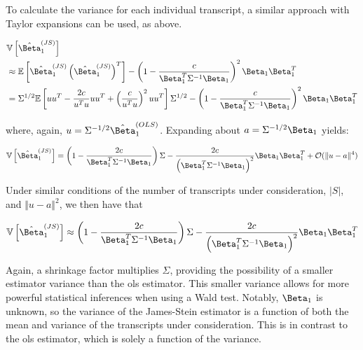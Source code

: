 To calculate the variance for each individual transcript, a similar approach with Taylor expansions can be used, as above.

\begin{align*}
  &\mathbb{V} \left[ \hat{\Beta}_1^{(JS)} \right] \\
  &\approx \mathbb{E} \left[ \hat{\Beta}_1^{(JS)}
    \left( \hat{\Beta}_1^{(JS)} \right)^T \right]
    - \left(1 - \frac{c}{\Beta_1^T \Sigma^{-1} \Beta_1} \right)^2 \Beta_1 \Beta_1^T \\
  &= \Sigma^{1/2} \mathbb{E} \left[ u u^T - \frac{2c}{u^Tu}uu^T + \left( \frac{c}{u^Tu} \right)^2 uu^T \right]\Sigma^{1/2}
    - \left(1 - \frac{c}{\Beta_1^T \Sigma^{-1} \Beta_1} \right)^2 \Beta_1 \Beta_1^T \\
\end{align*}

where, again, $u = \Sigma^{-1/2} \hat{\Beta}_1^{(OLS)}$.
Expanding about $a = \Sigma^{-1/2} \Beta_1$ yields:


\begin{equation*}
  \mathbb{V} \left [ \hat{\Beta}_1^{(JS)} \right]
  = \left(1 - \frac{2c}{\Beta_1^T \Sigma^{-1} \Beta_1} \right) \Sigma
    - \frac{2c}{\left( \Beta_1^T \Sigma^{-1} \Beta_1 \right)^2} \Beta_1 \Beta_1^T
    + \mathcal{O}(\Vert u - a \Vert ^4)
\end{equation*}

Under similar conditions of the number of transcripts under consideration, $|S|$, and $\Vert u - a \Vert ^2$, we then have that

\begin{equation}
  \mathbb{V} \left [ \hat{\Beta}_1^{(JS)} \right]
  \approx \left(1 - \frac{2c}{\Beta_1^T \Sigma^{-1} \Beta_1} \right) \Sigma
  - \frac{2c}{\left( \Beta_1^T \Sigma^{-1} \Beta_1 \right)^2} \Beta_1 \Beta_1^T
\end{equation}

Again, a shrinkage factor multiplies $\Sigma$, providing the possibility of a smaller estimator variance than the \gls{ols} estimator.
This smaller variance allows for more powerful statistical inferences when using a Wald test.
Notably, $\Beta_1$ is unknown, so the variance of the James-Stein estimator is a function of both the mean and variance of the transcripts under consideration.
This is in contrast to the \gls{ols} estimator, which is solely a function of the variance.
